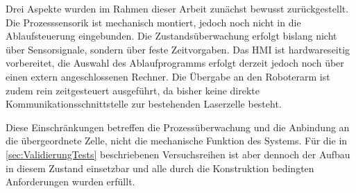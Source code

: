 Drei Aspekte wurden im Rahmen dieser Arbeit zunächst bewusst zurückgestellt. Die Prozesssensorik ist
mechanisch montiert, jedoch noch nicht in die Ablaufsteuerung eingebunden. Die
Zustandsüberwachung erfolgt bislang nicht über Sensorsignale, sondern über feste
Zeitvorgaben. Das HMI ist hardwareseitig vorbereitet, die
Auswahl des Ablaufprogramms erfolgt derzeit jedoch noch über einen extern
angeschlossenen Rechner. Die Übergabe an den Roboterarm ist zudem rein zeitgesteuert
ausgeführt, da bisher keine direkte Kommunikationsschnittstelle zur bestehenden
Laserzelle besteht.

Diese Einschränkungen betreffen die Prozessüberwachung und die Anbindung an die
übergeordnete Zelle, nicht die mechanische Funktion des Systems. Für die in
\cref{sec:ValidierungTests} beschriebenen Versuchsreihen ist aber dennoch der Aufbau in diesem Zustand
einsetzbar und alle durch die Konstruktion bedingten Anforderungen wurden erfüllt.

